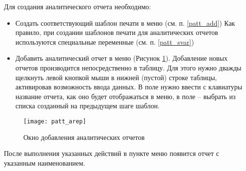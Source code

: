 Для создания аналитического отчета необходимо:
\begin{itemize}
 \item Создать соответствующий шаблон печати в меню  (см. п. \ref{patt_add}) Как правило, при создании шаблонов печати для аналитических отчетов используются специальные переменные (см. п. \ref{patt_svar})
 \item Добавить аналитический отчет в меню   (Рисунок \ref{img_patt_arep}). Добавление новых отчетов производится непосредственно в таблицу. Для этого нужно дважды щелкнуть левой кнопкой мыши в нижней (пустой) строке таблицы, активировав возможность ввода данных. В поле  нужно ввести с клавиатуры название отчета, как оно будет отображаться в меню, в поле  – выбрать из списка созданный на предыдущем шаге шаблон.
\end{itemize} 

\begin{figure}[ht]\centering
 \texttt{[image: patt\_arep]}
 \caption{Окно добавления аналитических отчетов}
 \label{img_patt_arep}
\end{figure}

После выполнения указанных действий в пункте меню  появится отчет с указанным наименованием.